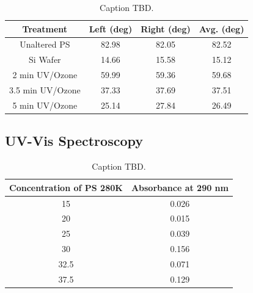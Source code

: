 \documentclass[twocolumn]{article}
\begin{document}
                \begin{table}
                    \centering
                    \begin{tabular}{@{}cccc@{}}
                        \toprule
                        Treatment                & Left (deg) & Right (deg) & Avg. (deg) \\ \midrule
                        Unaltered PS    & 82.98          & 82.05           & 82.52             \\
                        Si Wafer            & 14.66          & 15.58           & 15.12             \\
                        2 min UV/Ozone   & 59.99          & 59.36           & 59.68             \\
                        3.5 min UV/Ozone & 37.33          & 37.69           & 37.51             \\
                        5 min UV/Ozone   & 25.14          & 27.84           & 26.49             \\ \bottomrule
                        \end{tabular}
                    \caption{Caption TBD.}\label{tab:contact}
                \end{table}
            
            \subsection{UV-Vis Spectroscopy}

                \begin{table}
                    \centering
                    \begin{tabular}{@{}cc@{}}
                        \toprule
                        Concentration of PS 280K & Absorbance at 290 nm \\ \midrule
                        15                                & 0.026                \\
                        20                                & 0.015                \\
                        25                                & 0.039                \\
                        30                                & 0.156                \\
                        32.5                              & 0.071                \\
                        37.5                              & 0.129                \\ \bottomrule
                    \end{tabular}
                    \caption{Caption TBD.}\label{tab:abs}
                \end{table}
\end{document}
